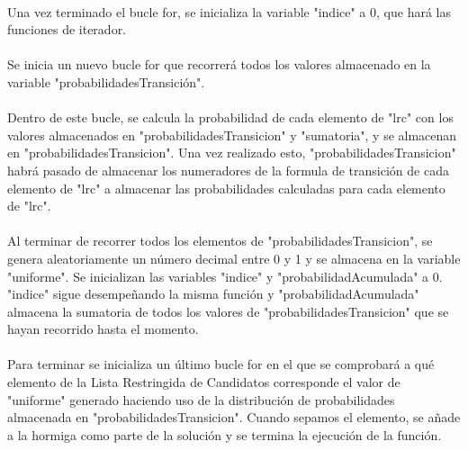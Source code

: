 	\paragraph{}Una vez terminado el bucle for, se inicializa la variable "indice" a 0, que hará las funciones de iterador.
	
	\paragraph{}Se inicia un nuevo bucle for que recorrerá todos los valores almacenado en la variable "probabilidadesTransición".
	
	\paragraph{}Dentro de este bucle, se calcula la probabilidad de cada elemento de "lrc" con los valores almacenados en "probabilidadesTransicion" y "sumatoria", y se almacenan en "probabilidadesTransicion". Una vez realizado esto, "probabilidadesTransicion" habrá pasado de almacenar los numeradores de la formula de transición de cada elemento de "lrc" a almacenar las probabilidades calculadas para cada elemento de "lrc".
	
	\paragraph{}Al terminar de recorrer todos los elementos de "probabilidadesTransicion", se genera aleatoriamente un número decimal entre 0 y 1 y se almacena en la variable "uniforme". Se inicializan las variables "indice" y "probabilidadAcumulada" a 0. "indice" sigue desempeñando la misma función y "probabilidadAcumulada" almacena la sumatoria de todos los valores de "probabilidadesTransicion" que se hayan recorrido hasta el momento.
	
	\paragraph{}Para terminar se inicializa un último bucle for en el que se comprobará a qué elemento de la Lista Restringida de Candidatos corresponde el valor de "uniforme" generado haciendo uso de la distribución de probabilidades almacenada en "probabilidadesTransicion". Cuando sepamos el elemento, se añade a la hormiga como parte de la solución y se termina la ejecución de la función.
	
	